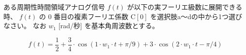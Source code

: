 ある周期性時間領域アナログ信号 $f(t)$ が以下の実フーリエ級数に展開できる時、
$f(t)$ の $0$ 番目の複素フーリエ係数 $\textrm{C}[0]$ を選択肢a〜dの中から1つ選びなさい。
なお $w_1$ [rad/秒] を基本角周波数とする。

\[
f(t) = 
\frac{1}{2}
+ \frac{3}{4} \cdot \cos( 1 \cdot w_1 \cdot t + \pi/9 )
+           3 \cdot \cos( 2 \cdot w_1 \cdot t - \pi/4 )
\]
